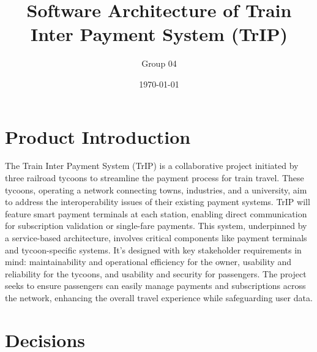 \documentclass{article}
\title{Software Architecture of Train Inter Payment System (TrIP)}
\author{Group 04}
\date{\today}
\begin{document}
\maketitle
\newpage

\tableofcontents
\newpage

\section{Product Introduction}
The Train Inter Payment System (TrIP) is a collaborative project initiated by three railroad tycoons to streamline the payment process for train travel. These tycoons, operating a network connecting towns, industries, and a university, aim to address the interoperability issues of their existing payment systems. TrIP will feature smart payment terminals at each station, enabling direct communication for subscription validation or single-fare payments. This system, underpinned by a service-based architecture, involves critical components like payment terminals and tycoon-specific systems. It's designed with key stakeholder requirements in mind: maintainability and operational efficiency for the owner, usability and reliability for the tycoons, and usability and security for passengers. The project seeks to ensure passengers can easily manage payments and subscriptions across the network, enhancing the overall travel experience while safeguarding user data.
\newpage

\section{Decisions}

\newpage

\newpage

\newpage

\newpage

\newpage

\newpage

\newpage

\newpage

\newpage

\newpage

\newpage

\newpage


\newpage


\appendix


% 
\end{document}
